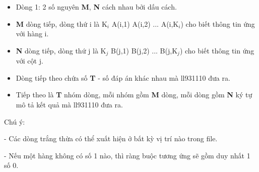 \begin{itemize}
	\item Dòng 1: 2 số nguyên \textbf{M}, \textbf{N} cách nhau bởi dấu cách.
	\item \textbf{M} dòng tiếp, dòng thứ i là K$_i$ A(i,1) A(i,2) ... A(i,K$_i$) cho biết thông tin ứng với hàng i.
	\item \textbf{N} dòng tiếp, dòng thứ j là K$_j$ B(j,1) B(j,2) ... B(j,K$_j$) cho biết thông tin ứng với cột j.
	\item Dòng tiếp theo chứa số \textbf{T} - số đáp án khác nhau mà ll931110 đưa ra.
	\item Tiếp theo là \textbf{T} nhóm dòng, mỗi nhóm gồm \textbf{M} dòng, mỗi dòng gồm \textbf{N} ký tự mô tả kết quả mà ll931110 đưa ra.
\end{itemize}

Chú ý:

- Các dòng trắng thừa có thể xuất hiện ở bất kỳ vị trí nào trong file.

- Nếu một hàng không có số 1 nào, thì ràng buộc tương ứng sẽ gồm duy nhất 1 số 0.